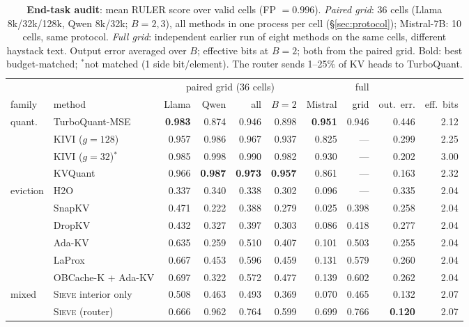 \documentclass{article}
\newcommand{\sieve}{\textsc{Sieve}}
\theoremstyle{definition}
\begin{document}
\begin{table}[t]
\centering
\footnotesize
\setlength{\tabcolsep}{2.6pt}
\caption{\textbf{End-task audit}: mean RULER score over valid cells (FP $=0.996$). \emph{Paired grid}: 36 cells (Llama 8k/32k/128k, Qwen 8k/32k; $B=2,3$), all methods in one process per cell (\S\ref{sec:protocol}); Mistral-7B: 10 cells, same protocol. \emph{Full grid}: independent earlier run of eight methods on the same cells, different haystack text. Output error averaged over $B$; effective bits at $B=2$; both from the paired grid. Bold: best budget-matched; $^\ast$not matched (1 side bit/element). The router sends 1--25\% of KV heads to TurboQuant.}
\label{tab:endtask}
\begin{tabular}{@{}llrrrrrrrr@{}}
\toprule
& & \multicolumn{4}{c}{paired grid (36 cells)} & & full & & \\
\cmidrule(lr){3-6}
family & method & Llama & Qwen & all & $B{=}2$ & Mistral & grid & out.\ err. & eff.\ bits \\
\midrule
\multirow{4}{*}{quant.} & TurboQuant-MSE & \textbf{0.983} & 0.874 & 0.946 & 0.898 & \textbf{0.951} & 0.946 & 0.446 & 2.12 \\
 & KIVI ($g{=}128$) & 0.957 & 0.986 & 0.967 & 0.937 & 0.825 & --- & 0.299 & 2.25 \\
 & KIVI ($g{=}32$)$^\ast$ & 0.985 & 0.998 & 0.990 & 0.982 & 0.930 & --- & 0.202 & 3.00 \\
 & KVQuant & 0.966 & \textbf{0.987} & \textbf{0.973} & \textbf{0.957} & 0.861 & --- & 0.163 & 2.32 \\
\midrule
\multirow{6}{*}{eviction} & H2O & 0.337 & 0.340 & 0.338 & 0.302 & 0.096 & --- & 0.335 & 2.04 \\
 & SnapKV & 0.471 & 0.222 & 0.388 & 0.279 & 0.025 & 0.398 & 0.258 & 2.04 \\
 & DropKV & 0.432 & 0.327 & 0.397 & 0.303 & 0.086 & 0.418 & 0.277 & 2.04 \\
 & Ada-KV & 0.635 & 0.259 & 0.510 & 0.407 & 0.101 & 0.503 & 0.255 & 2.04 \\
 & LaProx & 0.667 & 0.453 & 0.596 & 0.459 & 0.131 & 0.579 & 0.260 & 2.04 \\
 & OBCache-K + Ada-KV & 0.697 & 0.322 & 0.572 & 0.477 & 0.139 & 0.602 & 0.262 & 2.04 \\
\midrule
\multirow{2}{*}{mixed} & \sieve{} interior only & 0.508 & 0.463 & 0.493 & 0.369 & 0.070 & 0.465 & 0.132 & 2.07 \\
 & \sieve{} (router) & 0.666 & 0.962 & 0.764 & 0.599 & 0.699 & 0.766 & \textbf{0.120} & 2.07 \\
\bottomrule
\end{tabular}
\vspace{-2mm}
\end{table}
\end{document}
